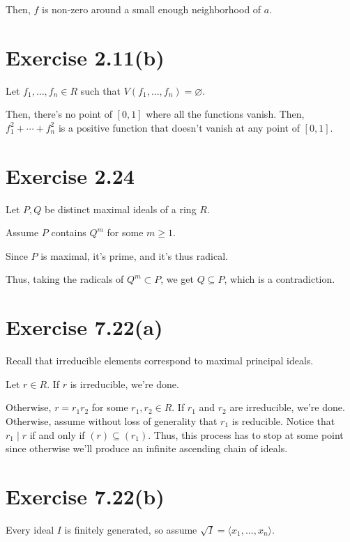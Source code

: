 \documentclass{article}
\theoremstyle{definition}
\begin{document}
Then, $ f $ is non-zero around a small enough neighborhood of $ a $.

\section{Exercise 2.11(b)}

Let $ f_{1}, \ldots, f_{n} \in R $ such that $ V(f_{1}, \ldots, f_{n}) = \varnothing $.

Then, there's no point of $ [0,1] $ where all the functions vanish.
Then, $ f_{1}^{2} + \cdots + f_{n}^{2} $ is a positive function that doesn't vanish at
any point of $ [0,1] $.

\section{Exercise 2.24}

Let $ P,Q $ be distinct maximal ideals of a ring $ R $.

Assume $ P $ contains $ Q^{m} $ for some $ m \geq 1 $.

Since $ P $ is maximal, it's prime, and it's thus radical.

Thus, taking the radicals of $ Q^{m} \subset P $, we get $ Q \subseteq P $,
which is a contradiction.




\section{Exercise 7.22(a)}

Recall that irreducible elements correspond to maximal principal ideals.

Let $ r \in R $. If $ r $ is irreducible, we're done.

Otherwise, $ r = r_{1}r_{2} $ for some $ r_{1}, r_{2} \in R $.
If $ r_{1} $ and $ r_{2} $ are irreducible, we're done. Otherwise,
assume without loss of generality that $ r_{1} $ is reducible. Notice that
$ r_{1} \mid r $ if and only if $ (r) \subseteq (r_{1}) $. Thus, this process
has to stop at some point since otherwise we'll produce an infinite ascending
chain of ideals.

\section{Exercise 7.22(b)}

Every ideal $ I $ is finitely generated, so assume $ \sqrt{I} = \langle x_{1}, \ldots, x_{n} \rangle $.
\end{document}
